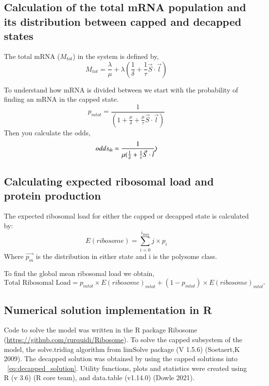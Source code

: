 \documentclass[review]{elsarticle}
\newcommand{\imax}{\ensuremath{{i_{\max}}}\xspace}
\begin{document}
\subsection{Calculation of the total mRNA population and its distribution between capped and decapped states}
The total mRNA ($M_{tot}$) in the system is defined by,
\begin{equation}
	M_{tot} = \frac{\lambda}{\mu} +  \lambda(\frac{1}{\delta} + \frac{1}{\tau}\vec{S} \cdot \vec{l})
\end{equation}

To understand how mRNA is divided  between we start with the probability of finding an mRNA in the capped state.
\begin{equation*}
	p_{mtot} = \frac{1}{(1  + \frac{\mu}{\delta} + \frac{\mu}{\tau}\vec{S} \cdot \vec{l})}	
\end{equation*}
Then you calculate the odds,
\begin{equation}\label{eq:odds}
	odds_{\hat{m}} = \frac{1}{\mu(\frac{1}{\delta} + \frac{1}{\tau}\vec{S} \cdot \vec{l}} )\\
\end{equation}


\subsection{Calculating expected ribosomal load and protein production}
The expected ribosomal load for either the capped or decapped state is calculated by:
\begin{equation}\label{eq:Expected_ribo_load}
	E(ribosome) =\sum_{i=0}^{\imax}j\times p_{i}
\end{equation}
Where $\vec{p_m}$ is the distribution in either state and i is the polysome class.

To find the global mean ribosomal load we obtain,
\begin{equation}\label{eq:System_ribo_load}
	\text{Total Ribosomal Load} = p_{mtot}\times E(ribosome)_{mtot} + (1-p_{mtot})\times E(ribosome)_{mtot^*}
\end{equation}

\subsection{Numerical solution implementation in R}
Code to solve the model was written in the R package Ribosome (\url{https://github.com/rurquidi/Ribosome}). To solve the capped subsystem of the model, the solve.tridiag algorithm from limSolve package (V 1.5.6) (Soetaert,K 2009). The decapped solution was obtained by using the capped solutions into ~\ref{eq:decapped_solution}. Utility functions, plots and statistics were created using  R (v 3.6) (R core team), and  data.table (v1.14.0) (Dowle 2021). 
		
\end{document}
